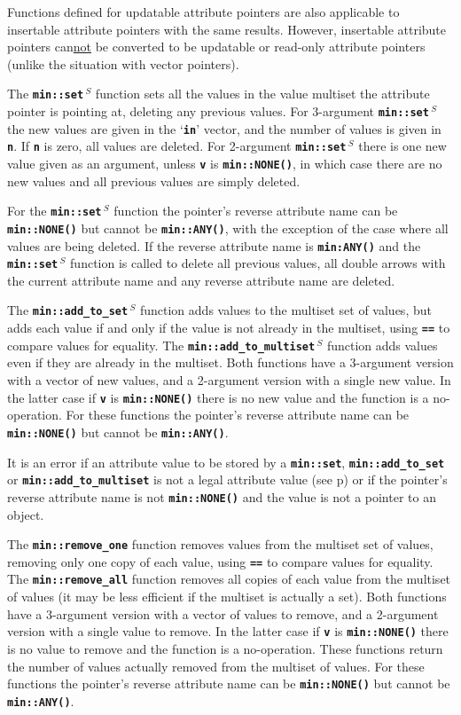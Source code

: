 \documentclass[12pt]{article}
\newcommand{\TT}[1]{{\tt \bfseries #1}}
\newcommand{\pagref}[1]{p\pageref{#1}}
\newcommand{\EOL}{\penalty \exhyphenpenalty}
\newcommand{\RESIZE}{$\,^S$}
\begin{document}
Functions defined for updatable attribute pointers are also
applicable to insertable attribute pointers with the
same results.  However, insertable attribute pointers
can\underline{not} be converted to be updatable or read-only attribute pointers
(unlike the situation with vector pointers).

The \TT{min::\EOL set\RESIZE}
function sets all the values in the value multiset the
attribute pointer is pointing at, deleting any previous values.
For 3-argument \TT{min::\EOL set\RESIZE}
the new values are given in the `\TT{in}' vector, and
the number of values is given in \TT{n}.  If \TT{n} is zero, all
values are deleted.
For 2-argument \TT{min::\EOL set\RESIZE} there is one new value given as an
argument, unless \TT{v} is \TT{min::NONE()},
in which case there are no new values and all previous values are simply
deleted.

For the \TT{min::\EOL set\RESIZE} function
\label{MIN::SET_DELETE_ANY}
the pointer's reverse attribute name can be \TT{min::NONE()}
but cannot be \TT{min::ANY()}, with the exception of the case
where all values are being deleted.  If the reverse attribute name
is \TT{min:ANY()} and the \TT{min::\EOL set\RESIZE} function is called to
delete all previous values,
all double arrows with the current attribute name and any
reverse attribute name are deleted.

The \TT{min::\EOL add\_\EOL to\_\EOL set\RESIZE} function
adds values to the multiset set of values,
but adds each value if and only if the value is not already in the multiset,
using \TT{==} to compare values for equality.
The \TT{min::\EOL add\_\EOL to\_\EOL multiset\RESIZE} function
adds values even if they are already in the multiset.
Both functions have a 3-argument version with a vector of new values,
and a 2-argument version with a single new value.  In the latter case
if \TT{v} is \TT{min::NONE()} there is no new value and the function
is a no-operation.
For these functions the pointer's reverse attribute name
can be \TT{min::NONE()}
but cannot be \TT{min::ANY()}.

It is an error if an attribute value to be stored by a \TT{min::set},
\TT{min::\EOL add\_\EOL to\_\EOL set}
or \TT{min::\EOL add\_\EOL to\_\EOL multiset}
is not a legal attribute value
(see \pagref{MIN::IS_ATTR_LEGAL}) or if the pointer's reverse attribute
name is not \TT{min::NONE()} and the value is not a pointer to an object.

The \TT{min::\EOL remove\_\EOL one} function
removes values from the multiset set of values, removing only one copy of
each value,
using \TT{==} to compare values for equality.
The \TT{min::\EOL remove\_\EOL all} function
removes all copies of each value  
from the multiset of values (it may be less efficient if
the multiset is actually a set).
Both functions have a 3-argument version with a vector of values to remove,
and a 2-argument version with a single value to remove.  In the latter case
if \TT{v} is \TT{min::NONE()} there is no value to remove and the function
is a no-operation.  These functions return the number of values actually
removed from the multiset of values.
For these functions the pointer's reverse attribute name
can be \TT{min::NONE()} but cannot be \TT{min::ANY()}.
\end{document}
